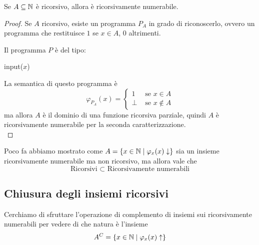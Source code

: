 \begin{theor}
	Se $A \subseteq \mathbb{N}$ è ricorsivo, allora è ricorsivamente numerabile.
\end{theor}
\begin{proof}
	Se $A$ ricorsivo, esiste un programma $P_{A}$ in grado di riconoscerlo, ovvero un programma che restituisce $1$ se $x \in A$, $0$ altrimenti.

	Il programma $P$ è del tipo:
	\begin{center}
		\begin{minipage}{.4\textwidth}
			\begin{tcolorbox}[
				colback=white,
				sharp corners,
				boxrule=.3mm,
				left=20pt,
				top=0pt,
				bottom=0pt,
				title=$P$,
				colbacktitle=white,
				coltitle=black
				]
				\begin{algorithm}[H]
					\SetAlgoNoEnd
					input($x$) \\
					 
				\end{algorithm}
			\end{tcolorbox}
		\end{minipage}
	\end{center}

	La semantica di questo programma è
	$$ \varphi_{P_A} (x) = \begin{cases}
		1 & \text{ se } x \in A\\
		\bot & \text{ se } x \notin A
	\end{cases}$$
	ma allora $A$ è il dominio di una funzione ricorsiva parziale, quindi $A$ è ricorsivamente numerabile per la seconda caratterizzazione.\\
\end{proof}

Poco fa abbiamo mostrato come $A = \left\{x \in \mathbb{N} \mid \varphi_x (x) \downarrow\right\}$ sia un insieme ricorsivamente numerabile ma non ricorsivo, ma allora vale che
$$\text{Ricorsivi } \subset \text{ Ricorsivamente numerabili} $$

\subsection{Chiusura degli insiemi ricorsivi}

Cerchiamo di sfruttare l'operazione di complemento di insiemi sui ricorsivamente numerabili per vedere di che natura è l'insieme
$$ A^C = \left\{x \in \mathbb{N} \mid \varphi_x (x) \uparrow \right\}$$

